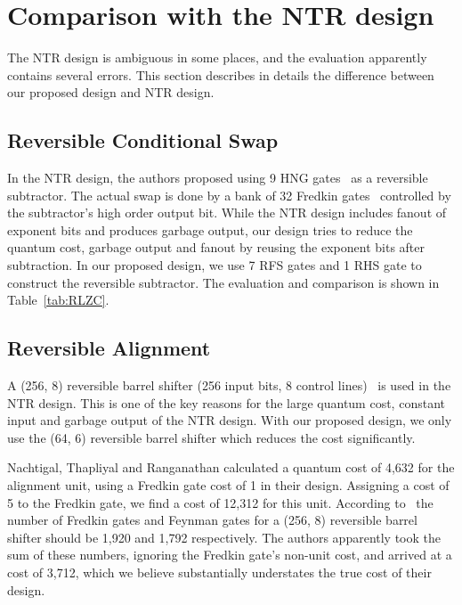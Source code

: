 \documentclass[%
reprint,
 amsmath,amssymb,
 aps,
]{revtex4-1}
\begin{document}
\section{Comparison with the NTR design}

The NTR design is ambiguous in some places, and the evaluation apparently contains several errors. This section describes in details the difference between our proposed design and NTR design.

\subsection{Reversible Conditional Swap}

In the NTR design, the authors proposed using 9 HNG gates~\cite{HNG} as a reversible subtractor. The actual swap is done by a bank of 32 Fredkin gates~\cite{fredkin} controlled by the subtractor's high order output bit. 
While the NTR design includes fanout of exponent bits and produces garbage output, our design tries to reduce the quantum cost, garbage output and fanout by reusing the exponent bits after subtraction. In our proposed design, we use 7 RFS gates and 1 RHS gate to construct the reversible subtractor. The evaluation and comparison is shown in Table~\ref{tab:RLZC}.

\subsection{Reversible Alignment}

A (256, 8) reversible barrel shifter (256 input bits, 8 control lines)~\cite{efficient-barrel} is used in the NTR design. This is one of the key reasons for the large quantum cost, constant input and garbage output of the NTR design. With our proposed design, we only use the (64, 6) reversible barrel shifter which reduces the cost significantly.

\par Nachtigal, Thapliyal and Ranganathan calculated a quantum cost of 4,632 for the alignment unit, using a Fredkin gate cost of 1 in their design. Assigning a cost of 5 to the Fredkin gate, we find a cost of 12,312 for this unit. According to~\cite{efficient-barrel} the number of Fredkin gates and Feynman gates for a (256, 8) reversible barrel shifter should be 1,920 and 1,792 respectively. The authors apparently took the sum of these numbers, ignoring the Fredkin gate's non-unit cost, and arrived at a cost of 3,712, which we believe substantially understates the true cost of their design. 
\end{document}
